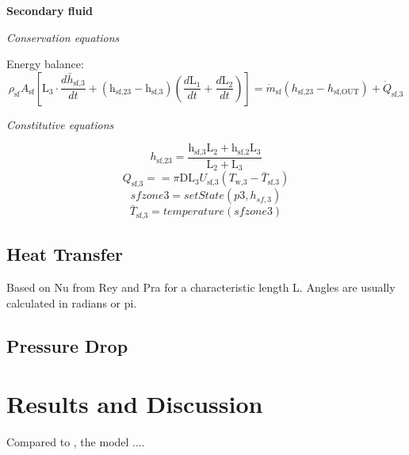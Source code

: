 \documentclass[11pt]{article} %
\begin{document}
{\bf Secondary fluid}
\begin{center}
\textit{Conservation equations}
\end{center}
Energy balance:\\
\begin{equation}
\rho_\text{sf} A_\text{sf} [\text{L}_\text{3} \cdot  \frac{d \bar{h}_\text{sf,3}}{d t} +  (\text{h}_\text{sf,23} - \text{h}_\text{sf,3}) ( \frac{d \text{L}_\text{1}}{d t} + \frac{d \text{L}_\text{2}}{d t})] = \dot{m}_\text{sf} ({h}_\text{sf,23} - h_\text{sf,OUT} ) + \dot{Q}_\text{sf,3} 
\end{equation}
\begin{center}
\textit{Constitutive equations}
\end{center}

\begin{equation}
h_\text{sf,23} = \frac{   \text{h}_\text{sf,3} \text{L}_\text{2}  + \text{h}_\text{sf,2}\text{L}_\text{3}      }{  \text{L}_\text{2} + \text{L}_\text{3}         } 
\end{equation}
\begin{equation}
{Q}_\text{sf,3} = = \pi \text{D} \text{L}_\text{3} U_\text{sf,3} (T_\text{w,3} - \bar{T}_\text{sf,3})
\end{equation}
\begin{equation}
sfzone3 = setState(p3,h_{sf,3})
\end{equation}
\begin{equation}
\bar{T}_\text{sf,3} = temperature(sfzone3)
\end{equation}
\subsection{Heat Transfer}

Based on \gls{Nu} from \gls{Rey} and \gls{Pra} for a characteristic length \gls{L}. Angles are usually calculated in radians or \gls{pi}.

\subsection{Pressure Drop}

\section{Results and Discussion}

Compared to \cite{Kaern2011b}, the model .... 
\end{document}
